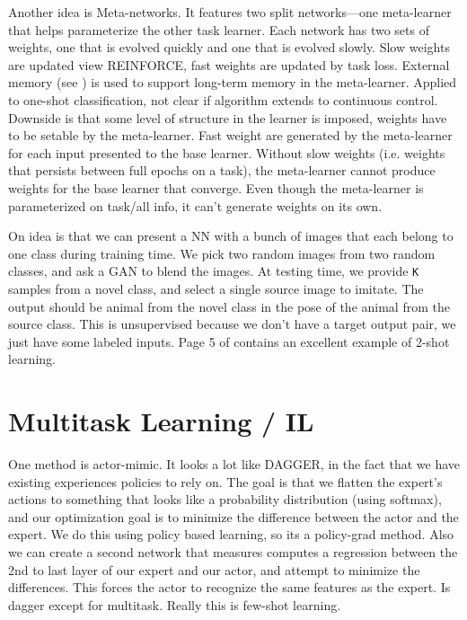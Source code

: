 \documentclass[american]{IEEEtran}   	%
\begin{document}
Another idea is Meta-networks.
It features two split networks---one meta-learner that helps parameterize the other task learner\cite{munkhdalai2017meta}.
Each network has two sets of weights, one that is evolved quickly and one that is evolved slowly.
Slow weights are updated view REINFORCE, fast weights are updated by task loss.
External memory (see \cite{pmlr-v48-santoro16}) is used to support long-term memory in the meta-learner.
Applied to one-shot classification, not clear if algorithm extends to continuous control.
Downside is that some level of structure in the learner is imposed, weights have to be setable by the meta-learner.
Fast weight are generated by the meta-learner for each input presented to the base learner.
Without slow weights (i.e. weights that persists between full epochs on a task), the meta-learner cannot produce weights for the base learner that converge.
Even though the meta-learner is parameterized on task/all info, it can't generate weights on its own.

On idea is that we can present a NN with a bunch of images that each belong to one class during training time\cite{Liu_2019}.
We pick two random images from two random classes, and ask a GAN to blend the images.
At testing time, we provide \texttt{K} samples from a novel class, and select a single source image to imitate.
The output should be animal from the novel class in the pose of the animal from the source class.
This is unsupervised because we don't have a  target output pair, we just have some labeled inputs.
Page 5 of \cite{Liu_2019} contains an excellent example of 2-shot learning.



\section{Multitask Learning / IL}
One method is actor-mimic\cite{parisotto2015actormimic}.
It looks a lot like DAGGER, in the fact that we have existing experiences policies to rely on.
The goal is that we flatten the expert's actions to something that looks like a probability distribution (using softmax), and our optimization goal is to minimize the difference between the actor and the expert.
We do this using policy based learning, so its a policy-grad method.
Also we can create a second network that measures computes a regression between the 2nd to last layer of our expert and our actor, and attempt to minimize the differences.
This forces the actor to recognize the same features as the expert.
Is dagger except for multitask.
Really this is few-shot learning.
\end{document}
